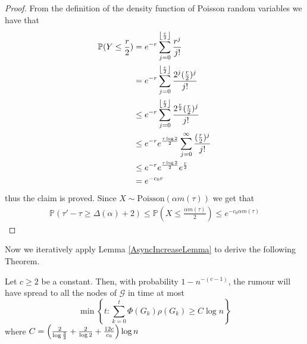 \begin{proof}
	\noindent
	From the definition of the density function of Poisson random variables we have that 
	\begin{align*}
		\mathbb{P}(Y \leq \frac{r}{2}) & = e^{-r} \sum_{j=0}^{\floor*{\frac{r}{2}}} \frac{r^j}{j!} \\
		& = e^{-r} \sum_{j=0}^{\floor*{\frac{r}{2}}} \frac{2^j(\frac{r}{2})^j}{j!} \\
		& \leq e^{-r} \sum_{j=0}^{\floor*{\frac{r}{2}}} \frac{2^\frac{r}{2}(\frac{r}{2})^j}{j!} \\
		& \leq e^{-r} e^\frac{r \log 2}{2} \sum_{j=0}^\infty \frac{(\frac{r}{2})^j}{j!} \\
		& \leq e^{-r} e^\frac{r \log 2}{2} e^\frac{r}{2} \\
		& = e^{-c_0r} \\
	\end{align*}
	thus the claim is proved. Since $X \sim \text{Poisson}(\alpha m(\tau))$ we get that
	\begin{align*}
		\mathbb{P}(\tau' - \tau \geq \Delta(\alpha) + 2) \leq \mathbb{P}(X \leq \frac{\alpha m(\tau)}{2}) \leq e^{-c_0 \alpha m(\tau)}
	\end{align*}	
\end{proof}

Now we iteratively apply Lemma \ref{AsyncIncreaseLemma} to derive the following Theorem.

\begin{theorem}\label{theorem:AsyncUpperBound}
	\ModelIntro Let $c \geq 2$ be a constant. Then, with probability $1 - n^{-(c-1)}$, the rumour will have spread to all the nodes of $\mathcal{G}$ in time at most
	$$
		\min \left\{t : \sum_{k=0}^t \Phi(G_k)\rho(G_k) \geq C \log n \right\} 
	$$
	where $C = \lb \frac{2}{\log \frac{3}{2}} + \frac{2}{\log 2} + \frac{12c}{c_0} \rb \log n$
\end{theorem}

